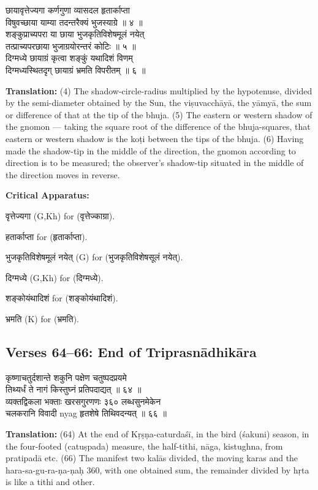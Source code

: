 \documentclass[11pt,a4paper]{article}
\newcommand{\dev}[1]{{\devanagarifont #1}}
\newcommand{\sanskritcol}[1]{%
  \begin{minipage}[t]{0.47\textwidth}
  \vspace{0pt}
  \begin{flushleft}
  #1
  \end{flushleft}
  \end{minipage}%
  \hfill
}
\newcommand{\englishcol}[1]{%
  \begin{minipage}[t]{0.47\textwidth}
  \vspace{0pt}
  \begin{flushleft}
  #1
  \end{flushleft}
  \end{minipage}%
}
\newenvironment{variants}{%
  \small%
  \color{varecolor}%
  \list{}{\leftmargin=2em\itemindent=-1em}%
}{\endlist}
\begin{document}
\noindent
\sanskritcol{\dev{छायावृत्तेज्यगा कर्णगुणा व्यासदल हृतार्काप्ता} \\ \dev{विषुवच्छाया याम्या तदन्तरैक्यं भुजस्याग्रे ॥ ४ ॥} \\[0.2cm]
\dev{शङ्कुप्राच्यपरा या छाया भुजकृतिविशेषमूलं नयेत्} \\ \dev{तत्प्राच्यपरछाया भुजाग्रयोरन्तरं कोटिः ॥ ५ ॥} \\[0.2cm]
\dev{दिग्मध्ये छायाग्रं कृत्वा शङ्कुं यथादिशं वि\-णम्} \\ \dev{दिग्मध्यस्थितदृग् छायाग्रं भ्रमति विपरीतम् ॥ ६ ॥}}
\englishcol{\textbf{Translation:} (4) The shadow-circle-radius multiplied by the hypotenuse,
divided by the semi-diameter obtained by the Sun, the viṣuvacchāyā, the yāmyā,
the sum or difference of that at the tip of the bhuja. (5) The eastern or western
shadow of the gnomon --- taking the square root of the difference of the bhuja-squares,
that eastern or western shadow is the koṭi between the tips of the bhuja. (6) Having
made the shadow-tip in the middle of the direction, the gnomon according to direction
is to be measured; the observer's shadow-tip situated in the middle of the direction
moves in reverse.}

\vspace{0.4cm}
\textcolor{varecolor}{\textbf{Critical Apparatus:}}
\begin{variants}
\item[4.1] \dev{वृत्तेज्यगा} (G,Kh) \dev{for} (\dev{वृत्तेज्काग्रा}).
\item[4.2] \dev{हतार्काप्ता} \dev{for} (\dev{हृतार्काप्ता}).
\item[5.1] \dev{भुजकृतिविशेषमूलं नयेत्} (G) \dev{for} (\dev{भुजकृतिविशेषसूलं नयेत्}).
\item[6.1] \dev{दिग्मध्ये} (G,Kh) \dev{for} (\dev{दिग्मध्ये}).
\item[6.2] \dev{शङ्कोयंथादिशं} \dev{for} (\dev{शङ्कोयंथादिशं}).
\item[6.3] \dev{भ्रमति} (K) \dev{for} (\dev{भ्रमति}).
\end{variants}

\subsection*{Verses 64--66: End of Triprasnādhikāra}

\noindent
\sanskritcol{\dev{कृष्णाचतुर्दशान्ते शकुनि पक्षेण चतुष्पदप्रयमे} \\ \dev{तिथ्यर्धं ते नागं किस्तुघ्नं प्रतिपदाद्यत् ॥ ६४ ॥} \\[0.2cm]
\dev{व्यक्तद्विकला भक्ताः खरसगुरणणः ३६० लब्धसुनमेकेन} \\ \dev{चलकरानि विवादी nyag हृतशेषे तिथिवदन्यत् ॥ ६६ ॥}}
\englishcol{\textbf{Translation:} (64) At the end of Kṛṣṇa-caturdaśī, in the bird (śakuni)
season, in the four-footed (catuṣpada) measure, the half-tithi, nāga, kistughna,
from pratipadā etc. (66) The manifest two kalās divided, the moving karas and
the hara-sa-gu-ra-ṇa-ṇaḥ 360, with one obtained sum, the remainder divided by hṛta
is like a tithi and other.}
\end{document}
